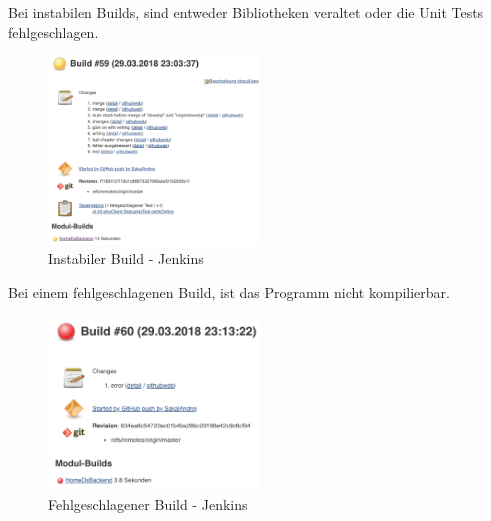 Bei instabilen Builds, sind entweder Bibliotheken veraltet oder die Unit Tests fehlgeschlagen.

\begin{figure}[H]
\centering
\includegraphics[width=0.5\textwidth]{images/09_CI/instable.png}
\caption{Instabiler Build - Jenkins}
\label{img:instable}
\end{figure}

Bei einem fehlgeschlagenen Build, ist das Programm nicht kompilierbar.

\begin{figure}[H]
\centering
\includegraphics[width=0.5\textwidth]{images/09_CI/nocompile.png}
\caption{Fehlgeschlagener Build - Jenkins}
\label{img:error}
\end{figure}


